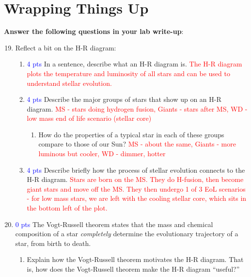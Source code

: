 \documentclass[11pt]{article}
\begin{document}
\section{Wrapping Things Up}
\textbf{Answer the following questions in your lab write-up}:
\begin{enumerate}
\setcounter{enumi}{18}

    \item Reflect a bit on the H-R diagram:
    \begin{enumerate}
        \item \textcolor{blue}{4 pts} In a sentence, describe what an H-R diagram is.
        \textcolor{red}{The H-R diagram plots the temperature and luminosity of all stars and can be used to understand stellar evolution.}
        
        \item\textcolor{blue}{4 pts} Describe the major groups of stars that show up on an H-R diagram. 
        \textcolor{red}{MS - stars doing hydrogen fusion, Giants - stars after MS, WD - low mass end of life scenario (stellar core)}
        \begin{enumerate}
            \item How do the properties of a typical star in each of these groups compare to those of our Sun?
            \textcolor{red}{MS - about the same, Giants - more luminous but cooler, WD - dimmer, hotter}
        \end{enumerate} 
        
        \item \textcolor{blue}{4 pts} Describe briefly how the process of stellar evolution connects to the H-R diagram.
        \textcolor{red}{Stars are born on the MS. They do H-fusion, then become giant stars and move off the MS. They then undergo 1 of 3 EoL scenarios - for low mass stars, we are left with the cooling stellar core, which sits in the bottom left of the plot.}
        
    \end{enumerate}
    
    
    \item \textcolor{blue}{0 pts} The Vogt-Russell theorem states that the mass and chemical composition of a star \emph{completely} determine the evolutionary trajectory of a star, from birth to death. 
    \begin{enumerate}
        \item Explain how the Vogt-Russell theorem motivates the H-R diagram. That is, how does the Vogt-Russell theorem make the H-R diagram ``useful?''
        

\end{enumerate}
\end{enumerate}
\end{document}
